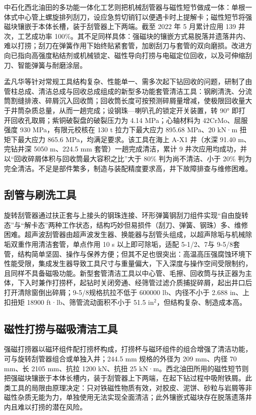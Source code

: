 中石化西北油田的多功能一体化工艺则把机械刮管器与磁性短节做成一体：单根一体式中心管上螺旋排列刮刀，设应急剪切销钉以便遇卡时上提解卡；磁性短节将强磁块镶嵌于本体长槽，装于刮管器上下两端。截至 2022 年 5 月累计应用 139 井次，工艺成功率 100\%。其不足同样具体：强磁块的镶嵌方式易脱落并遗落井内、难以打捞；刮刀在弹簧作用下始终贴紧套管，加剧刮刀与套管的双向磨损。改进方向已指向高强度粘结剂或机械锁定、磁性导向打捞与电磁定位回收，以及可伸缩刮刀、智能弹簧与耐磨涂层。

孟凡华等针对常规工具结构复杂、性能单一、需多次起下钻回收的问题，研制了由管柱总成、清洁总成与回收总成组成的新型多功能套管清洁工具：钢刷清洗、分流筒割缝排液、碎屑沉入回收筒；回收筒长度可按预测碎屑量增减，使极限回收量大于井筒杂质总量，从而一趟完成；设钢珠—喇叭孔的锁定开关装置，转 90° 即打开回收孔取屑；紫铜破裂盘的破裂压力为 4.14 MPa；心轴材料为 42CrMo、屈服强度 930 MPa，有限元校核在 130 t 拉力下最大应力 895.68 MPa、20 kN·m 扭矩下最大应力 865.6 MPa，均满足要求。该工具在海上 A-X1 井（水深 91.40 m、完钻井深 5050 m、224.5 mm 套管）一趟完成清洁，累计 9 井次应用均成功，并以“回收碎屑体积与回收筒最大容积之比”大于 80\% 判为尚不清洁、小于 20\% 判为完全清洁。不足是部件繁多，制造与装配精度要求高，井下故障排查与维修困难。

\subsection{刮管与刷洗工具}

旋转刮管器通过扶正套与上接头的钢珠连接、环形弹簧钢刮刀组件实现“自由旋转态”与“解卡态”两种工作状态，结构巧妙但易损件（刮刀、弹簧、钢珠）多、维修困难。超声波刮管器由超声波发生器、换能器与刮管头组成，以超声除垢与机械除垢双重作用清洁套管，单点作用 10 s 以上即可除垢，适配 5-1/2\inch、7\inch 与 9-5/8\inch 套管，结构简单坚固、操作与保养方便；但其不足也很突出：高温高压强腐蚀环境下性能受限，集成发生器导致工具尺寸与重量偏大，下入深度与操作空间受限制约，且同样不具备磁吸功能。新型套管清洁工具以中心管、毛擦、回收筒与扶正器为主体，下入时兼作打捞杯，起钻时关闭旁通、经筛管过滤介质捕捉碎屑，起出井口后打开清除窗倒出碎屑；9-5/8\inch 规格抗拉不低于 600000 lb、内径不小于 2.688 in、上扣扭矩 18900 ft·lb、筛管流动面积不小于 51.5 in$^2$，但结构复杂、制造成本高。

\subsection{磁性打捞与磁吸清洁工具}

强磁打捞器以磁环组件配打捞杯构成，打捞杯与磁环组件的组合增强了清洁功能，可与旋转刮管器组合或单独入井；244.5 mm 规格的外径为 209 mm、内径 70 mm、长 2105 mm、抗拉 1200 kN、抗扭 25 kN·m。西北油田所用的磁性短节则把强磁块镶嵌于本体长槽内，装于刮管器上下两端，在起下钻过程中吸附铁屑。此类工具的局限由原理决定：只对铁磁性物质有效，对胶皮、泥饼、砂粒与岩屑等非磁性杂质无能为力，单独使用无法实现全面清洁；此外镶嵌式磁块存在脱落遗落井内且难以打捞的潜在风险。

